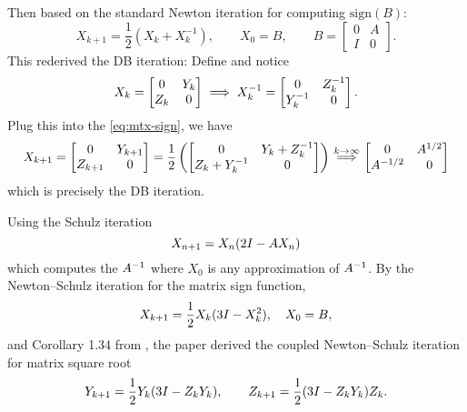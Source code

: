 \documentclass{article}
\begin{document}
Then based on the standard Newton iteration for computing
$\mathrm{sign}(B)$:
\begin{equation}\label{eq:mtx-sign}
  X_{k+1} = \frac{1}{2} (X_k + X_k^{-1}), \qquad X_0 = B, 
  \qquad   
  B = 
  \begin{bmatrix}
    0 & A \\ I & 0 
  \end{bmatrix}.
\end{equation}
This rederived the DB iteration: Define and notice
\begin{equation}\notag
  X_k =
  \begin{bmatrix}
    0 & Y_{k} \\ Z_k & 0 
  \end{bmatrix} \implies 
  X_k^{-1} = 
  \begin{bmatrix}
    0 & Z_k ^{-1} \\ Y_k^{-1} & 0
  \end{bmatrix}.
\end{equation}
Plug this into the \eqref{eq:mtx-sign}, we have
\begin{equation}\notag
  X_{k + 1} =
  \begin{bmatrix}
    0 & Y_{k + 1} \\ Z_{k+1} & 0
  \end{bmatrix} = 
  \frac{1}{2} \left( 
    \begin{bmatrix}
      0 & Y_k + Z_k^{-1} \\ Z_k + Y_k^{-1} & 0
    \end{bmatrix}
  \right) \stackrel{k\to\infty}{\implies}
  \begin{bmatrix}
    0 & A^{1/2} \\ A^{-1/2} & 0
  \end{bmatrix}
\end{equation}
which is precisely the DB iteration.

Using the Schulz iteration
\begin{equation}\notag
  X_{n + 1} = X_n(2I - AX_n)
\end{equation}
which computes the $A^{-1}$ where $X_0$ is any approximation of $A^{-1}$. By
the Newton--Schulz iteration for the matrix sign function,
\begin{equation}\notag
  X_{k+1} = \frac{1}{2}X_k(3I - X_k^2), \quad X_0 = B,
\end{equation}
and Corollary 1.34 from \cite{high08_fm}, the paper derived the coupled
Newton--Schulz iteration for matrix square root
\begin{equation}\notag
  Y_{k + 1} = \frac{1}{2}Y_k(3I - Z_{k}Y_k), 
  \qquad Z_{k+1} = \frac{1}{2} (3I - Z_kY_k)Z_k.
\end{equation}
\end{document}
